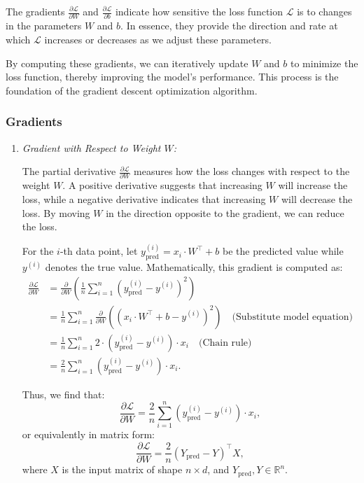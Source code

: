 The gradients $\frac{\partial \mathcal{L}}{\partial W}$ and $\frac{\partial \mathcal{L}}{\partial b}$ indicate how sensitive the loss function $\mathcal{L}$ is to changes in the parameters $W$ and $b$. In essence, they provide the direction and rate at which $\mathcal{L}$ increases or decreases as we adjust these parameters.

By computing these gradients, we can iteratively update $W$ and $b$ to minimize the loss function, thereby improving the model's performance. This process is the foundation of the gradient descent optimization algorithm.


\subsubsection{Gradients}
\begin{enumerate}
    \item \textit{Gradient with Respect to Weight \( W \):}

    The partial derivative \( \frac{\partial \mathcal{L}}{\partial W} \) measures how the loss changes with respect to the weight \( W \). A positive derivative suggests that increasing \( W \) will increase the loss, while a negative derivative indicates that increasing \( W \) will decrease the loss. By moving \( W \) in the direction opposite to the gradient, we can reduce the loss.

    For the \( i \)-th data point, let \( y_\text{pred}^{(i)} = x_i \cdot W^\top + b \) be the predicted value while \( y^{(i)} \) denotes the true value. Mathematically, this gradient is computed as:
    \begin{align*}
        \frac{\partial \mathcal{L}}{\partial W} &= \frac{\partial}{\partial W} \left( \frac{1}{n} \sum_{i=1}^n (y_\text{pred}^{(i)} - y^{(i)})^2 \right) \\
        &= \frac{1}{n} \sum_{i=1}^n \frac{\partial}{\partial W} \left( (x_i \cdot W^\top + b - y^{(i)})^2 \right) \quad \text{(Substitute model equation)} \\
        &= \frac{1}{n} \sum_{i=1}^n 2 \cdot (y_\text{pred}^{(i)} - y^{(i)}) \cdot x_i \quad \text{(Chain rule)} \\
        &= \frac{2}{n} \sum_{i=1}^n (y_\text{pred}^{(i)} - y^{(i)}) \cdot x_i.
    \end{align*}

    Thus, we find that:
    \begin{equation}
    \label{eq:gradient-w}
    \frac{\partial \mathcal{L}}{\partial W} = \frac{2}{n} \sum_{i=1}^n (y_\text{pred}^{(i)} - y^{(i)}) \cdot x_i,
    \end{equation}
    or equivalently in matrix form:
    \begin{equation}
    \label{eq:gradient-w-matrix}
    \frac{\partial \mathcal{L}}{\partial W} = \frac{2}{n} \left( Y_{\text{pred}} - Y \right)^\top X,
    \end{equation}
    where \( X \) is the input matrix of shape \( n \times d \), and \( Y_{\text{pred}}, Y \in \mathbb{R}^n \).


\end{enumerate}
